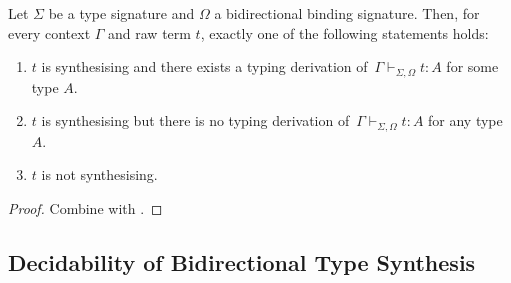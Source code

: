 \begin{corollary}
  Let $\Sigma$ be a type signature and $\Omega$ a bidirectional binding signature.
  Then, for every context $\Gamma$ and raw term $t$, exactly one of the following statements holds:
  \begin{enumerate}
    \item $t$ is synthesising and there exists a typing derivation of\, $\Gamma \vdash_{\Sigma, \Omega} t : A$ for some type $A$.
    \item $t$ is synthesising but there is no typing derivation of\, $\Gamma \vdash_{\Sigma, \Omega} t : A$ for any type $A$.
    \item $t$ is not synthesising.
  \end{enumerate}
\end{corollary}
\begin{proof}
  Combine   with .
  
\end{proof}

\subsection{Decidability of Bidirectional Type Synthesis}

